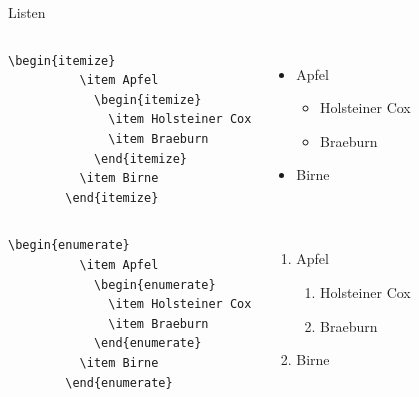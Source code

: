 \begin{Frame}[fragile]{Listen}
  \begin{columns}
    \column{5cm}
      \begin{lstlisting}[gobble=8]
        \begin{itemize}
          \item Apfel
            \begin{itemize}
              \item Holsteiner Cox
              \item Braeburn
            \end{itemize}
          \item Birne
        \end{itemize}
      \end{lstlisting}
    \column{4cm}
      \begin{itemize}
        \item Apfel
          \begin{itemize}
            \item Holsteiner Cox
            \item Braeburn
          \end{itemize}
        \item Birne
      \end{itemize}
  \end{columns}
  
  \begin{columns}
    \column{5cm}
      \begin{lstlisting}[gobble=8]
        \begin{enumerate}
          \item Apfel
            \begin{enumerate}
              \item Holsteiner Cox
              \item Braeburn
            \end{enumerate}
          \item Birne
        \end{enumerate}
      \end{lstlisting}
    \column{4cm}
      \begin{enumerate}
        \item Apfel
          \begin{enumerate}
            \item Holsteiner Cox
            \item Braeburn
          \end{enumerate}
        \item Birne
      \end{enumerate}
  \end{columns}
\end{Frame}

